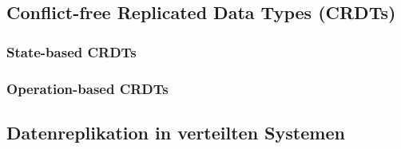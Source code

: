 \documentclass[oneside,bibliography=totocnumbered,BCOR=5mm]{scrbook}
\begin{document}
\subsection{Conflict-free Replicated Data Types (CRDTs)}

\subsubsection{State-based CRDTs}

\subsubsection{Operation-based CRDTs}


\subsection{Datenreplikation in verteilten Systemen}




\printbibliography[
heading=bibintoc,
title={Quellenverzeichnis}
]
\end{document}
